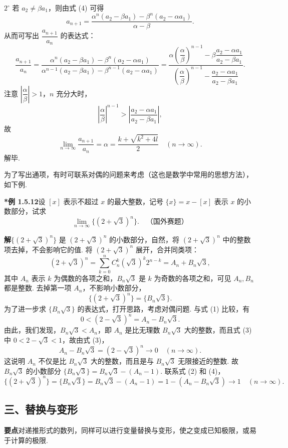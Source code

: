 \documentclass[UTF8, 12pt, fontset=fandol, oneside]{ctexart}
\begin{document}
$2^\circ$ 若 $a_2\ne \beta a_1$，则由式 (4) 可得
\[
  a_{n+1}
  =\frac{\alpha^n(a_2-\beta a_1)-\beta^n(a_2-\alpha a_1)}{\alpha-\beta}.
\]
从而可写出 $\dfrac{a_{n+1}}{a_n}$ 的表达式：
\[
  \frac{a_{n+1}}{a_n}
  =\frac{\alpha^n(a_2-\beta a_1)-\beta^n(a_2-\alpha a_1)}
    {\alpha^{n-1}(a_2-\beta a_1)-\beta^{n-1}(a_2-\alpha a_1)}
  =\frac{\alpha\left(\dfrac{\alpha}{\beta}\right)^{n-1}
      -\beta\dfrac{a_2-\alpha a_1}{a_2-\beta a_1}}
    {\left(\dfrac{\alpha}{\beta}\right)^{n-1}
      -\dfrac{a_2-\alpha a_1}{a_2-\beta a_1}}.
\]
注意 $\left|\dfrac{\alpha}{\beta}\right|>1$，$n$ 充分大时，
\[
  \left|\frac{\alpha}{\beta}\right|^{n-1}
  >\left|\frac{a_2-\alpha a_1}{a_2-\beta a_1}\right|,
\]
故
\[
  \lim_{n\to\infty}\frac{a_{n+1}}{a_n}
  =\alpha=\frac{k+\sqrt{k^2+4l}}{2}\quad (n\to\infty).
\]
解毕.

为了写出通项，有时可联系对偶的问题来考虑（这也是数学中常用的思想方法），如下例.

\noindent\textbf{*例 1.5.12}\quad 设 $[x]$ 表示不超过 $x$ 的最大整数，记号 $\{x\}=x-[x]$ 表示 $x$ 的小数部分，试求
\[
  \lim_{n\to\infty}\{(2+\sqrt3)^n\}. \quad \text{（国外赛题）}
\]

\noindent\textbf{解}\quad $\{(2+\sqrt3)^n\}$ 是 $(2+\sqrt3)^n$ 的小数部分，自然，将 $(2+\sqrt3)^n$ 中的整数项去掉，不会影响它的值. 将 $(2+\sqrt3)^n$ 展开，合并同类项：
\[
  (2+\sqrt3)^n=\sum_{k=0}^n C_n^k(\sqrt3)^k2^{n-k}=A_n+B_n\sqrt3,
\tag{1}
\]
其中 $A_n$ 表示 $k$ 为偶数的各项之和，$B_n\sqrt3$ 是 $k$ 为奇数的各项之和，可见 $A_n,B_n$ 都是整数. 去掉第一项 $A_n$，不影响小数部分，
\[
  \{(2+\sqrt3)^n\}=\{B_n\sqrt3\}.
\tag{2}
\]
为了进一步求 $\{B_n\sqrt3\}$ 的表达式，打开思路，考虑对偶问题. 与式 (1) 比较，有
\[
  0<(2-\sqrt3)^n=A_n-B_n\sqrt3.
\tag{3}
\]
由此，我们发现，$B_n\sqrt3<A_n$，即 $A_n$ 是比无理数 $B_n\sqrt3$ 大的整数，而且式 (3) 中 $0<2-\sqrt3<1$，故由式 (3)，
\[
  A_n-B_n\sqrt3=(2-\sqrt3)^n\to 0\quad (n\to\infty).
\tag{4}
\]
这说明 $A_n$ 不仅是比 $B_n\sqrt3$ 大的整数，而且是与 $B_n\sqrt3$ 无限接近的整数. 故 $B_n\sqrt3$ 的小数部分 $\{B_n\sqrt3\}=B_n\sqrt3-(A_n-1)$. 联系式 (2) 和 (4)，
\[
  \{(2+\sqrt3)^n\}=\{B_n\sqrt3\}
  =B_n\sqrt3-(A_n-1)
  =1-(A_n-B_n\sqrt3)\to 1\quad (n\to\infty).
\]

\subsection*{三、替换与变形}

\noindent\textbf{要点}\quad 对递推形式的数列，同样可以进行变量替换与变形，使之变成已知极限，或易于计算的极限.
\end{document}
